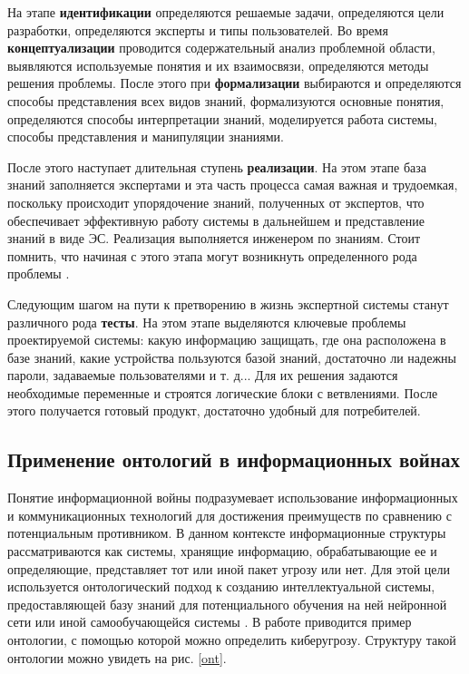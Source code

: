 На этапе \textbf{идентификации} определяются решаемые задачи, определяются цели разработки,
определяются эксперты и типы пользователей. Во время \textbf{концептуализации} проводится
содержательный анализ проблемной области, выявляются используемые понятия и их взаимосвязи,
определяются методы решения проблемы. После этого при \textbf{формализации}
выбираются и определяются способы представления всех видов знаний, формализуются основные
понятия, определяются способы интерпретации знаний, моделируется работа системы, способы
представления и манипуляции знаниями.

После этого наступает длительная ступень \textbf{реализации}. На этом этапе база знаний
заполняется экспертами и эта часть процесса самая важная и трудоемкая, поскольку происходит
упорядочение знаний, полученных от экспертов, что обеспечивает эффективную работу системы
в дальнейшем и представление знаний в виде ЭС. Реализация выполняется инженером по знаниям.
Стоит помнить, что начиная с этого этапа могут возникнуть определенного рода проблемы \cite{idea}.

Следующим шагом на пути к претворению в жизнь экспертной системы станут различного рода \textbf{тесты}.
На этом этапе выделяются ключевые проблемы проектируемой системы: какую информацию защищать, где она
расположена в базе знаний, какие устройства пользуются базой знаний, достаточно ли надежны пароли,
задаваемые пользователями и т. д... Для их решения задаются необходимые переменные и строятся логические
блоки с ветвлениями. После этого получается готовый продукт, достаточно удобный для потребителей.

\subsection{Применение онтологий в информационных войнах}
Понятие информационной войны подразумевает использование информационных и коммуникационных
технологий для достижения преимуществ по сравнению с потенциальным противником. В данном контексте
информационные структуры рассматриваются как системы, хранящие информацию, обрабатывающие ее и определяющие,
представляет тот или иной пакет угрозу или нет. Для этой цели используется онтологический подход к созданию
интеллектуальной системы, предоставляющей базу знаний для потенциального обучения на ней нейронной сети
или иной самообучающейся системы \cite{wars}. В работе \cite{wars} приводится пример онтологии, с помощью которой
можно определить киберугрозу. Структуру такой онтологии можно увидеть на рис. \ref{ont}.

